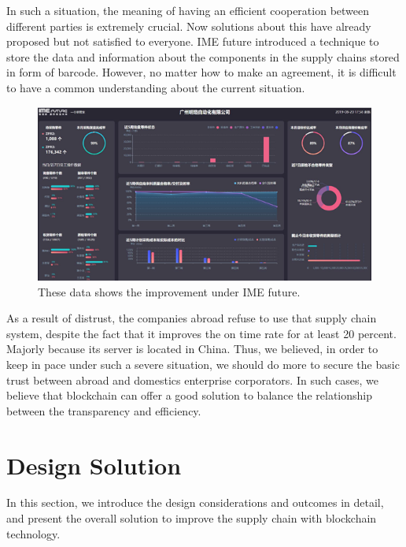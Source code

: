 \documentclass[12pt]{article}
\begin{document}
In such a situation, the meaning of having an efficient cooperation between different parties is extremely crucial. Now solutions about this have already proposed but not satisfied to everyone. IME future introduced a technique to store the data and information about the components in the supply chains stored in form of barcode. However, no matter how to make an agreement, it is difficult to have a common understanding about the current situation.
\begin{figure}
\centering
\includegraphics[width=1\textwidth]{efficiency.png}
\caption{\label{fig:efficiency}These data shows the improvement under IME future.}
\end{figure}
As a result of distrust, the companies abroad refuse to use that supply chain system, despite the fact that it improves the on time rate for at least 20 percent. Majorly because its server is located in China. Thus, we believed, in order to keep in pace under such a severe situation, we should do more to secure the basic trust between abroad and domestics enterprise corporators. In such cases, we believe that blockchain\cite{dus} can offer a good solution to balance the relationship between the transparency and efficiency. 


%

\section{Design Solution}
In this section, we introduce the design considerations and outcomes in detail, and present the overall solution to improve the supply chain with blockchain technology.
\end{document}
